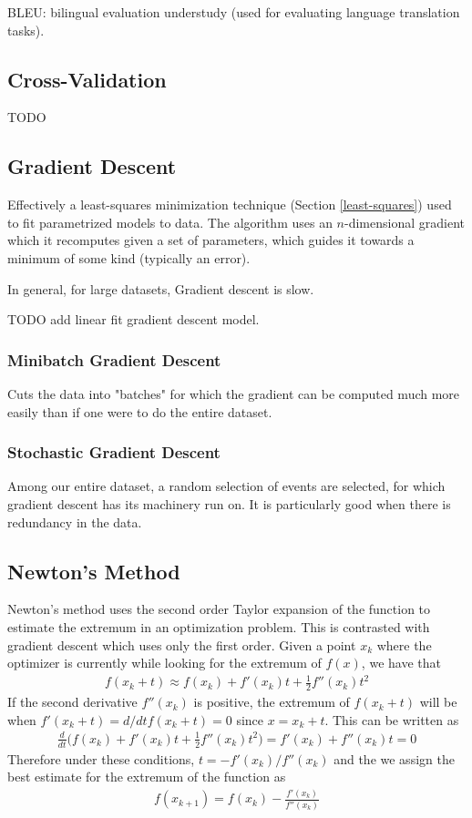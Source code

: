BLEU: bilingual evaluation understudy (used for evaluating language translation tasks).

\subsection{Cross-Validation}
TODO

\subsection{Gradient Descent}
Effectively a least-squares minimization technique (Section \ref{least-squares}) used to fit parametrized models to data. The algorithm uses an $n$-dimensional gradient which it recomputes given a set of parameters, which guides it towards a minimum of some kind (typically an error). 

In general, for large datasets, Gradient descent is slow.

TODO add linear fit gradient descent model.

\subsubsection{Minibatch Gradient Descent}
Cuts the data into "batches" for which the gradient can be computed much more easily than if one were to do the entire dataset.

\subsubsection{Stochastic Gradient Descent}
Among our entire dataset, a random selection of events are selected, for which gradient descent has its machinery run on. It is particularly good when there is redundancy in the data.

\subsection{Newton's Method}
Newton's method uses the second order Taylor expansion of the function to estimate the extremum in an optimization problem. This is contrasted with gradient descent which uses only the first order. Given a point $x_k$ where the optimizer is currently while looking for the extremum of $f(x)$, we have that
\begin{align}
	f(x_k+t)\approx f(x_k) + f'(x_k)t + \frac{1}{2}f''(x_k)t^2
\end{align}
If the second derivative $f''(x_k)$ is positive, the extremum of $f(x_k+t)$ will be when $f'(x_k+t) = d/dt f(x_k+t) = 0$ since $x=x_k+t$. This can be written as 
\begin{align}
	\frac{d}{dt}\Big( f(x_k) + f'(x_k)t + \frac{1}{2}f''(x_k)t^2\Big) = f'(x_k)+f''(x_k)t = 0 
\end{align}
Therefore under these conditions, $t = -f'(x_k)/f''(x_k)$ and the we assign the best estimate for the extremum of the function as
\begin{align}
	f(x_{k+1}) = f(x_k)-\frac{f'(x_k)}{f''(x_k)}
\end{align} 


